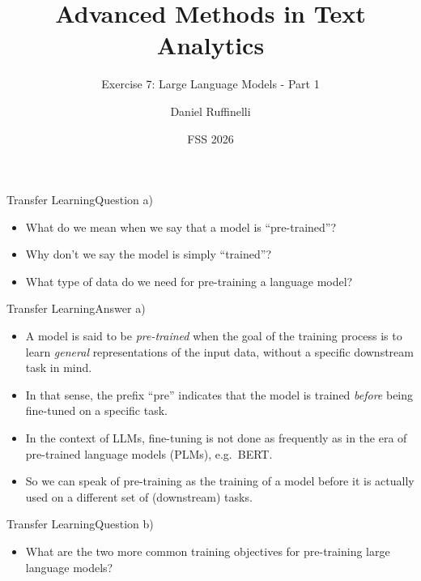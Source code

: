 \documentclass[t]{beamer}
\title[Write your short title here]{Advanced Methods in Text Analytics}
\subtitle{Exercise 7: Large Language Models - Part 1}
\author{Daniel Ruffinelli}
\institute{University of Mannheim}
\date{FSS 2026}
\begin{document}

\begin{frame}
    \titlepage{}
\end{frame}

\begin{frame}{Transfer Learning}{Question a)}
    \begin{itemize}
        \item What do we mean when we say that a model is ``pre-trained''?
        \item Why don't we say the model is simply ``trained''?
        \item What type of data do we need for pre-training a language model?
    \end{itemize}
\end{frame}

\begin{frame}{Transfer Learning}{Answer a)}
    \begin{itemize}
        \item A model is said to be \emph{pre-trained} when the goal of the
              training process is to learn \emph{general} representations of the
              input data, without a specific downstream task in mind.
        \item In that sense, the prefix ``pre'' indicates that the
              model is trained \emph{before} being fine-tuned on a specific
              task.
        \item In the context of LLMs, fine-tuning is not done as frequently as
              in the era of pre-trained language models (PLMs), e.g.\ BERT.
        \item So we can speak of pre-training as the training of a model before
              it is actually used on a different set of (downstream) tasks.
    \end{itemize}
\end{frame}

\begin{frame}{Transfer Learning}{Question b)}
    \begin{itemize}
        \item What are the two more common training objectives for pre-training
              large language models?
    \end{itemize}
\end{frame}
\end{document}
